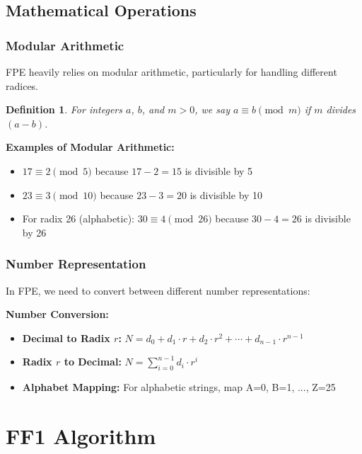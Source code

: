 \documentclass[11pt,a4paper]{article}
\newtheorem{definition}[theorem]{Definition}
\begin{document}
\subsection{Mathematical Operations}

\subsubsection{Modular Arithmetic}

FPE heavily relies on modular arithmetic, particularly for handling different radices.

\begin{definition}
For integers $a$, $b$, and $m > 0$, we say $a \equiv b \pmod{m}$ if $m$ divides $(a - b)$.
\end{definition}

\begin{examplebox}
\textbf{Examples of Modular Arithmetic:}
\begin{itemize}
    \item $17 \equiv 2 \pmod{5}$ because $17 - 2 = 15$ is divisible by 5
    \item $23 \equiv 3 \pmod{10}$ because $23 - 3 = 20$ is divisible by 10
    \item For radix 26 (alphabetic): $30 \equiv 4 \pmod{26}$ because $30 - 4 = 26$ is divisible by 26
\end{itemize}
\end{examplebox}

\subsubsection{Number Representation}

In FPE, we need to convert between different number representations:

\begin{mathbox}
\textbf{Number Conversion:}
\begin{itemize}
    \item \textbf{Decimal to Radix $r$:} $N = d_0 + d_1 \cdot r + d_2 \cdot r^2 + \cdots + d_{n-1} \cdot r^{n-1}$
    \item \textbf{Radix $r$ to Decimal:} $N = \sum_{i=0}^{n-1} d_i \cdot r^i$
    \item \textbf{Alphabet Mapping:} For alphabetic strings, map A=0, B=1, ..., Z=25
\end{itemize}
\end{mathbox}

\section{FF1 Algorithm}
\end{document}
